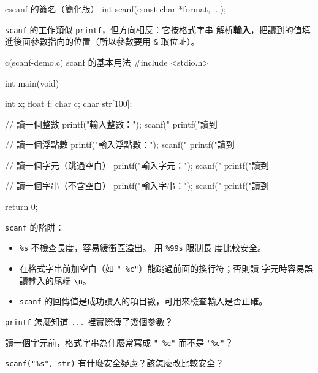 \begin{code}{c}{scanf 的簽名（簡化版）}
int scanf(const char *format, ...);
\end{code}

\texttt{scanf} 的工作類似 \texttt{printf}，但方向相反：它按格式字串
解析\textbf{輸入}，把讀到的值填進後面參數指向的位置（所以參數要用
\texttt{\&} 取位址）。

\begin{example}{c}{(scanf-demo.c) scanf 的基本用法}
#include <stdio.h>

int main(void) {
    int x;
    float f;
    char c;
    char str[100];

    // 讀一個整數
    printf("輸入整數：");
    scanf("%
    printf("讀到 %

    // 讀一個浮點數
    printf("輸入浮點數：");
    scanf("%
    printf("讀到 %

    // 讀一個字元（跳過空白）
    printf("輸入字元：");
    scanf(" %
    printf("讀到 %

    // 讀一個字串（不含空白）
    printf("輸入字串：");
    scanf("%
    printf("讀到 %

    return 0;
}
\end{example}


\texttt{scanf} 的陷阱：
\begin{itemize}
\item \texttt{\%s} 不檢查長度，容易緩衝區溢出。 用 \texttt{\%99s} 限制長
度比較安全。
\item 在格式字串前加空白（如 \texttt{" \%c"}）能跳過前面的換行符；否則讀
字元時容易誤讀輸入的尾端 \texttt{\textbackslash n}。
\item \texttt{scanf} 的回傳值是成功讀入的項目數，可用來檢查輸入是否正確。
\end{itemize}


\begin{drills}[label=drills:func-variadic]
\item \texttt{printf} 怎麼知道 \texttt{...} 裡實際傳了幾個參數？
\item 讀一個字元前，格式字串為什麼常寫成 \texttt{" \%c"} 而不是
\texttt{"\%c"}？
\item \texttt{scanf("\%s", str)} 有什麼安全疑慮？該怎麼改比較安全？
\end{drills}

